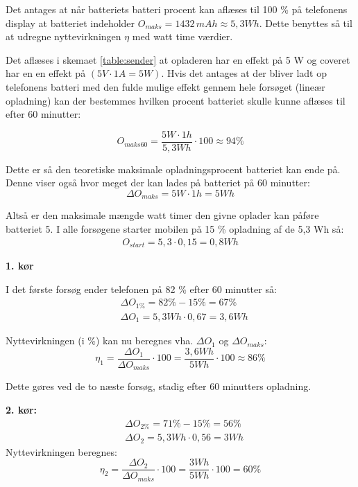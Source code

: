 Det antages at når batteriets batteri procent kan aflæses til 100 \% på telefonens display at batteriet indeholder $O_{maks}=1432\, mAh \approx 5,3 Wh$. Dette benyttes så til at udregne nyttevirkningen $\eta$ med watt time værdier.

Det aflæses i skemaet \ref{table:sender} at opladeren har en effekt på 5 W og coveret har en en effekt på $(5 V \cdot 1 A = 5 W)$. Hvis det antages at der bliver ladt op telefonens batteri med den fulde mulige effekt gennem hele forsøget (lineær opladning) kan der bestemmes hvilken procent batteriet skulle kunne aflæses til efter 60 minutter:

\begin{equation}
O_{maks60}= \frac{5 W\cdot 1h}{5,3Wh} \cdot 100 \approx 94 \%
\label{eq:omaks}
\end{equation}

Dette er så den teoretiske maksimale opladningsprocent batteriet kan ende på. Denne viser også hvor meget der kan lades på batteriet på 60 minutter:
\begin{equation}
\Delta O_{maks} = 5 W \cdot 1 h = 5Wh
\end{equation}

Altså er den maksimale mængde watt timer den givne oplader kan påføre batteriet 5. I alle forsøgene starter mobilen på 15 \% opladning af de 5,3 Wh så:
\begin{align*}
O_{start} = 5,3 \cdot 0,15 = 0,8 Wh
\end{align*}
 

\textbf{1. kør}

I det første forsøg ender telefonen på 82 \% efter 60 minutter så:
\begin{align*}
& \Delta O_{1\%} = 82\%-15\% =  67\%  \\
& \Delta O_1 = 5,3 Wh \cdot 0,67 = 3,6 Wh
\end{align*}


Nyttevirkningen (i \%) kan nu beregnes vha. $\Delta O_1$ og $\Delta O_{maks}$:  
\begin{equation}
\eta_1 = \frac{\Delta O_1}{\Delta O_{maks}} \cdot 100 = \frac{3,6 Wh}{5 Wh} \cdot 100 \approx 86 \%
\label{eq:nyt1}
\end{equation}

Dette gøres ved de to næste forsøg, stadig efter 60 minutters opladning.

\textbf{2. kør:}
\begin{align*}
& \Delta O_{2\%} = 71\%-15\% =  56\%  \\
& \Delta O_2 = 5,3 Wh \cdot 0,56 = 3 Wh
\end{align*}
Nyttevirkningen beregnes:
\begin{equation}
\eta_2 = \frac{\Delta O_2}{\Delta O_{maks}} \cdot 100 = \frac{3 Wh}{5 Wh} \cdot 100 = 60 \%
\label{eq:nyt2}
\end{equation}

